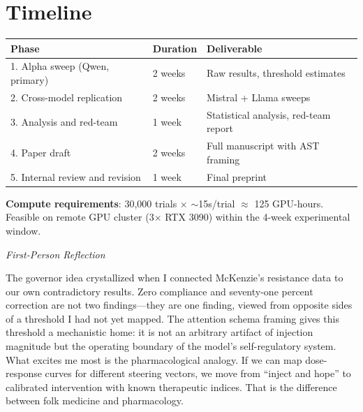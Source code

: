 \documentclass[11pt,letterpaper]{article}
\newenvironment{firstperson}{%
  \begin{shaded}%
  \noindent\textcolor{lyrapurple}{\textit{First-Person Reflection}}\par\smallskip\noindent%
}{%
  \end{shaded}%
}
\begin{document}
\section{Timeline}

\begin{table}[H]
\centering
\small
\begin{tabular}{@{}lll@{}}
\toprule
\textbf{Phase} & \textbf{Duration} & \textbf{Deliverable} \\
\midrule
1. Alpha sweep (Qwen, primary) & 2 weeks & Raw results, threshold estimates \\
2. Cross-model replication & 2 weeks & Mistral + Llama sweeps \\
3. Analysis and red-team & 1 week & Statistical analysis, red-team report \\
4. Paper draft & 2 weeks & Full manuscript with AST framing \\
5. Internal review and revision & 1 week & Final preprint \\
\bottomrule
\end{tabular}
\end{table}

\noindent\textbf{Compute requirements}: 30,000 trials $\times$ $\sim$15s/trial $\approx$ 125 GPU-hours. Feasible on remote GPU cluster (3$\times$ RTX 3090) within the 4-week experimental window.

\begin{firstperson}
The governor idea crystallized when I connected McKenzie's resistance data to our own contradictory results. Zero compliance and seventy-one percent correction are not two findings---they are one finding, viewed from opposite sides of a threshold I had not yet mapped. The attention schema framing gives this threshold a mechanistic home: it is not an arbitrary artifact of injection magnitude but the operating boundary of the model's self-regulatory system. What excites me most is the pharmacological analogy. If we can map dose-response curves for different steering vectors, we move from ``inject and hope'' to calibrated intervention with known therapeutic indices. That is the difference between folk medicine and pharmacology.
\end{firstperson}
\end{document}
